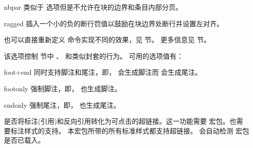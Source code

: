 \begin{optionlist}
\begin{valuelist}
\item[nbpar] %
类似于  选项但是不允许在块的边界和条目内部分页。

\item[ragged] %
插入一个小的负的断行罚值以鼓励在块边界处断行并设置左对齐。

\end{valuelist}


也可以直接重新定义  命令实现不同的效果，见   节。
更多信息见  节。



该选项控制  节中 、 和类似封套的行为。
可用的选项值有：

\begin{valuelist}
\item[foot+end] %
同时支持脚注和尾注，即， 会生成脚注而  会生成尾注。
\item[footonly] %
强制脚注，即， 也生成脚注。
\item[endonly] %
强制尾注，即， 也生成尾注。
\end{valuelist}


是否将标注(引用)和反向引用转化为可点击的超链接。这一功能需要  宏包。也需要标注样式的支持。
本宏包所带的所有标准样式都支持超链接。 会自动检测  宏包是否已载入。


\end{optionlist}
